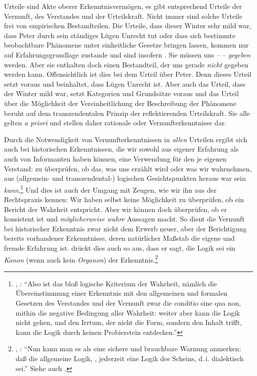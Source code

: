 Urteile sind Akte oberer Erkenntnisvermögen, es gibt entsprechend Urteile der
Vernunft, des Verstandes und der Urteilskraft. Nicht immer sind solche Urteile
frei von empirischen Bestandteilen. Die Urteile, dass dieser Winter sehr mild
war, dass Peter durch sein ständiges Lügen Unrecht tut oder dass sich bestimmte
beobachtbare Phänomene unter einheitliche Gesetze bringen lassen, kommen nur auf
Erfahrungsgrundlage zustande und sind insofern .
Sie müssen uns --  -- \emph{gegeben} werden. Aber sie
enthalten doch einen  Bestandteil, der uns gerade
\emph{nicht} gegeben werden kann. Offensichtlich ist dies bei dem Urteil über
Peter. Denn dieses Urteil setzt voraus und beinhaltet, dass Lügen Unrecht ist.
Aber auch das Urteil, dass der Winter mild war, setzt Kategorien und Grundsätze
voraus und das Urteil über die Möglichkeit der Vereinheitlichung der Beschreibung der
Phänomene beruht auf dem transzendentalen Prinzip der reflektierenden
Urteilskraft. Sie alle gelten \emph{a priori} und stellen daher rationale oder
Vernunfterkenntnisse dar.

Durch die Notwendigkeit von Vernunfterkenntnissen in \emph{allen} Urteilen
ergibt sich auch bei historischen Erkenntnissen, die wir sowohl aus eigener
Erfahrung als auch von Informanten haben können, eine Verwendung für den je
eigenen Verstand: zu überprüfen, ob das, was uns erzählt wird oder was wir
wahrnehmen, aus (allgemein- und transzendental-) logischen Gesichtspunkten
heraus war sein \emph{kann}.\footnote{\cite[Vgl.][B
84]{Kant:KritikderreinenVernunft2003}, \cite[][III:
80.11--16]{Kant:GesammelteWerke1900ff.}: \enquote{Also ist das bloß logische
Kriterium der Wahrheit, nämlich die Übereinstimmung einer Erkenntnis mit den
allgemeinen und formalen Gesetzen des Verstandes und der Vernunft zwar die
conditio sine qua non, mithin die negative Bedingung aller Wahrheit: weiter aber
kann die Logik nicht gehen, und den Irrtum, der nicht die Form, sondern den
Inhalt trifft, kann die Logik durch keinen Probierstein entdecken.}} Und dies
ist auch der Umgang mit Zeugen, wie wir ihn aus der Rechtspraxis kennen: Wir
haben selbst keine Möglichkeit zu überprüfen, ob ein Bericht der Wahrheit
entspricht. Aber wir können doch überprüfen, ob er konsistent ist und
\emph{möglicherweise wahre} Aussagen macht.
So dient die Vernunft bei historischer Erkenntnis zwar nicht dem Erwerb neuer,
aber der Berichtigung bereits vorhandener Erkenntnisse, deren natürlicher
Maßstab die eigene und fremde Erfahrung ist.  drückt dies
auch so aus, dass er sagt, die Logik sei ein \emph{Kanon} (wenn auch kein
\emph{Organon}) der Erkenntnis.\footnote{\cite[Vgl.][B
86]{Kant:KritikderreinenVernunft2003}, \cite[][III:
81.11--13]{Kant:GesammelteWerke1900ff.}: \enquote{Nun kann man es als eine
sichere und brauchbare Warnung anmerken: daß die allgemeine Logik, , jederzeit eine Logik des Scheins, d.\,i. dialektisch sei.}
Siehe auch \cite[][B 87\,f.,]{Kant:KritikderreinenVernunft2003} \cite[][III:
81.30--82.32]{Kant:GesammelteWerke1900ff.}.}

